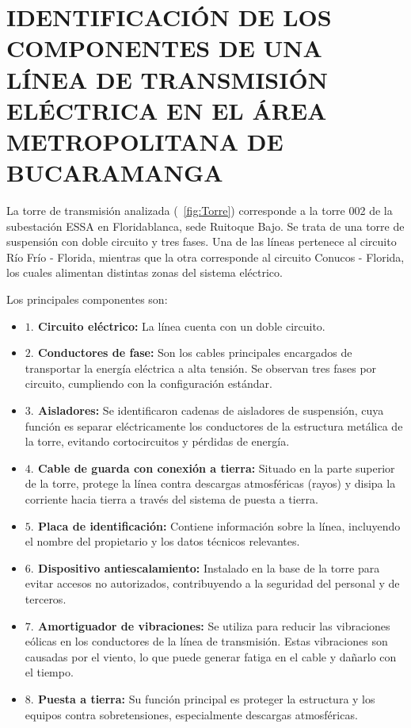 \section{IDENTIFICACIÓN DE LOS COMPONENTES DE UNA LÍNEA DE TRANSMISIÓN ELÉCTRICA EN EL ÁREA METROPOLITANA DE BUCARAMANGA}

La torre de transmisión analizada (\figurename~\ref{fig:Torre}) corresponde a la torre 002 de la subestación ESSA en Floridablanca, sede Ruitoque Bajo. Se trata de una torre de suspensión con doble circuito y tres fases. Una de las líneas pertenece al circuito Río Frío - Florida, mientras que la otra corresponde al circuito Conucos - Florida, los cuales alimentan distintas zonas del sistema eléctrico.

Los principales componentes son:

\begin{itemize}
    \item \textbf{$1.$ Circuito eléctrico:} La línea cuenta con un doble circuito.
    \item \textbf{$2.$ Conductores de fase:} Son los cables principales encargados de transportar la energía eléctrica a alta tensión. Se observan tres fases por circuito, cumpliendo con la configuración estándar.
    \item \textbf{$3.$ Aisladores:} Se identificaron cadenas de aisladores de suspensión, cuya función es separar eléctricamente los conductores de la estructura metálica de la torre, evitando cortocircuitos y pérdidas de energía.
    \item \textbf{$4.$ Cable de guarda con conexión a tierra:} Situado en la parte superior de la torre, protege la línea contra descargas atmosféricas (rayos) y disipa la corriente hacia tierra a través del sistema de puesta a tierra.
    \item \textbf{$5.$ Placa de identificación:} Contiene información sobre la línea, incluyendo el nombre del propietario y los datos técnicos relevantes.
    \item \textbf{$6.$ Dispositivo antiescalamiento:} Instalado en la base de la torre para evitar accesos no autorizados, contribuyendo a la seguridad del personal y de terceros.
    \item \textbf{$7.$ Amortiguador de vibraciones:} Se utiliza para reducir las vibraciones eólicas en los conductores de la línea de transmisión. Estas vibraciones son causadas por el viento, lo que puede generar fatiga en el cable y dañarlo con el tiempo.
    \item \textbf{$8.$ Puesta a tierra:} Su función principal es proteger la estructura y los equipos contra sobretensiones, especialmente descargas atmosféricas.
\end{itemize}



